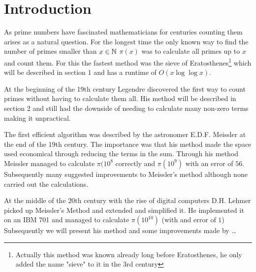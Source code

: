 %

\usepackage{todonotes}
\usepackage{biblatex}
%

\usepackage[stable]{footmisc}
\usepackage{caption}
\usepackage{subcaption}
\usepackage{listings}
\lstset{
	breakatwhitespace=True,
	breaklines=True,
	tabsize=2,
	extendedchars=True,
	keepspaces=True
}

	


\section{Introduction}
As prime numbers have fascinated mathematicians for centuries counting them arises as a natural question.
For the longest time the only known way to find the number of primes smaller than $x \in \mathbb{N}$ $\pi(x)$ 
was to calculate all primes up to $x$ and count them.
For this the fastest method was the sieve of Eratosthenes\footnote{Actually this
method was known already long before Eratosthenes, he only added the name  "sieve" to it in the 3rd century}
which will be described in section 1 and has a runtime of $O(x \log \log x)$.

At the beginning of the 19th century Legendre discovered the first way to count primes without having to calculate them all.
His method will be described in section 2 and still had the downside of needing to calculate many non-zero terms
making it unpractical.

The first efficient algorithm was described by the astronomer E.D.F. Meissler at the end of the 19th century.
The importance was that his method made the space used economical through reducing the terms in the sum.
Through his method Meissler managed to calculate $\pi(10^{8}$ correctly and $\pi(10^{9})$ with an error of $56$.
Subsequently many suggested improvements to Meissler's method although none carried out the calculations.

At the middle of the $20$th century with the rise of digital computers D.H. Lehmer picked up Meissler's
Method and extended and simplified it. He implemented it on an IBM 701 and managed to calculate  $\pi(10^{10})$ (with and error of $1$)
Subsequently we will present his method and some improvements made by \ldots

